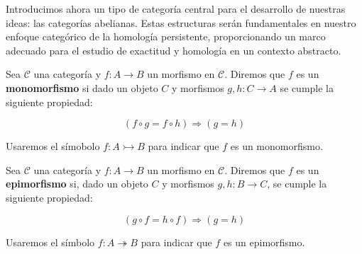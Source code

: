 Introducimos ahora un tipo de categoría central para el desarrollo de nuestras ideas: las categorías abelianas. Estas estructuras serán fundamentales en nuestro enfoque categórico de la homología persistente, proporcionando un marco adecuado para el estudio de exactitud y homología en un contexto abstracto.


\begin{definicion} [Monomorfismo]
    Sea $\mathscr{C}$ una categoría y $f: A \longrightarrow B$ un morfismo en $\mathscr{C}$. Diremos que $f$ es un \textbf{monomorfismo} si dado un objeto $C$ y morfismos $g,h: C \longrightarrow A$ se cumple la siguiente propiedad:

    \begin{equation}
        (f \circ g = f \circ h) \Rightarrow (g = h)
    \end{equation}

    Usaremos el símobolo $f: A \rightarrowtail B$ para indicar que $f$ es un monomorfismo.
\end{definicion}

\begin{definicion} [Epimorfismo]
    Sea $\mathscr{C}$ una categoría y $f: A \longrightarrow B$ un morfismo en $\mathscr{C}$. Diremos que $f$ es un \textbf{epimorfismo} si, dado un objeto $C$ y morfismos $g,h: B \longrightarrow C$, se cumple la siguiente propiedad:

    \begin{equation}
        (g \circ f = h \circ f) \Rightarrow (g = h)
    \end{equation}

    Usaremos el símbolo $f: A \twoheadrightarrow B$ para indicar que $f$ es un epimorfismo.
\end{definicion}


